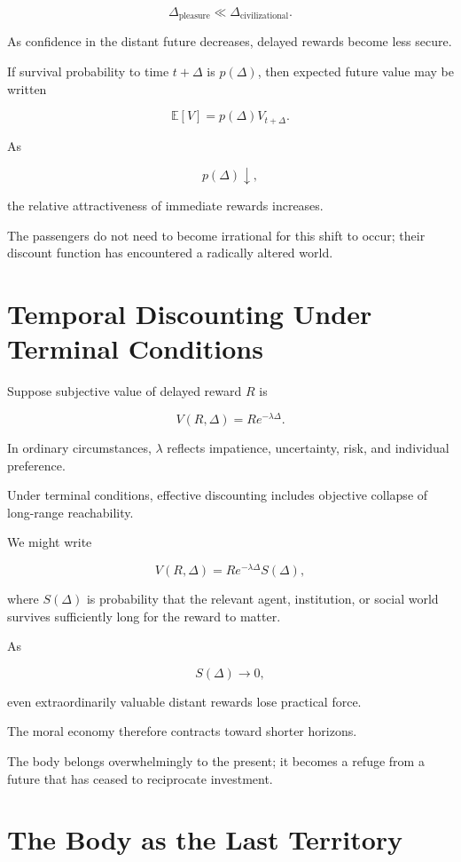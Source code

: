 \documentclass[11pt,oneside]{book}
\theoremstyle{definition}
\theoremstyle{remark}
\begin{document}
\[
\Delta_{\mathrm{pleasure}}
\ll
\Delta_{\mathrm{civilizational}}.
\]

As confidence in the distant future decreases, delayed rewards become less secure.

If survival probability to time \(t+\Delta\) is \(p(\Delta)\), then expected future value may be written

\[
\mathbb E[V]
=
p(\Delta)V_{t+\Delta}.
\]

As

\[
p(\Delta)\downarrow,
\]

the relative attractiveness of immediate rewards increases.

The passengers do not need to become irrational for this shift to occur; their discount function has encountered a radically altered world.

\section{Temporal Discounting Under Terminal Conditions}

Suppose subjective value of delayed reward \(R\) is

\[
V(R,\Delta)
=
R e^{-\lambda\Delta}.
\]

In ordinary circumstances, \(\lambda\) reflects impatience, uncertainty, risk, and individual preference.

Under terminal conditions, effective discounting includes objective collapse of long-range reachability.

We might write

\[
V(R,\Delta)
=
R e^{-\lambda\Delta}S(\Delta),
\]

where \(S(\Delta)\) is probability that the relevant agent, institution, or social world survives sufficiently long for the reward to matter.

As

\[
S(\Delta)\rightarrow0,
\]

even extraordinarily valuable distant rewards lose practical force.

The moral economy therefore contracts toward shorter horizons.

The body belongs overwhelmingly to the present; it becomes a refuge from a future that has ceased to reciprocate investment.

\section{The Body as the Last Territory}
\end{document}
